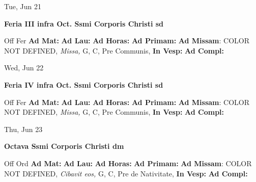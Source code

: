 \documentclass[10pt]{memoir}
\begin{document}
\begin{center}
\begin{minipage}{3.5in}
\vspace{2em}
\begin{center}Tue, Jun 21
\end{center}
\textbf{ \large Feria III infra Oct. Ssmi Corporis Christi
\textnormal{\normalsize sd}}

\begin{justify}Off Fer
\textbf{Ad Mat: }
\textbf{Ad Lau: }
\textbf{Ad Horas: }
\textbf{Ad Primam: }\textbf{Ad Missam}: COLOR NOT DEFINED, \textit{Missa,} G, C, Pre Communis, 
\textbf{In Vesp: }
\textbf{Ad Compl: }
\end{justify}
\end{minipage}
\end{center}

\begin{center}
\begin{minipage}{3.5in}
\vspace{2em}
\begin{center}Wed, Jun 22
\end{center}
\textbf{ \large Feria IV infra Oct. Ssmi Corporis Christi
\textnormal{\normalsize sd}}

\begin{justify}Off Fer
\textbf{Ad Mat: }
\textbf{Ad Lau: }
\textbf{Ad Horas: }
\textbf{Ad Primam: }\textbf{Ad Missam}: COLOR NOT DEFINED, \textit{Missa,} G, C, Pre Communis, 
\textbf{In Vesp: }
\textbf{Ad Compl: }
\end{justify}
\end{minipage}
\end{center}

\begin{center}
\begin{minipage}{3.5in}
\vspace{2em}
\begin{center}Thu, Jun 23
\end{center}
\textbf{ \large Octava Ssmi Corporis Christi
\textnormal{\normalsize dm}}

\begin{justify}Off Ord
\textbf{Ad Mat: }
\textbf{Ad Lau: }
\textbf{Ad Horas: }
\textbf{Ad Primam: }\textbf{Ad Missam}: COLOR NOT DEFINED, \textit{Cibavit eos,} G, C, Pre de Nativitate, 
\textbf{In Vesp: }
\textbf{Ad Compl: }
\end{justify}
\end{minipage}
\end{center}
\end{document}
